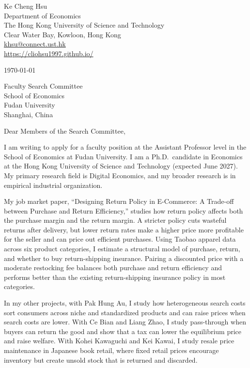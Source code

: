 \documentclass[11pt]{article}
\begin{document}
\begin{flushleft}
Ke Cheng Hsu \\
Department of Economics \\
The Hong Kong University of Science and Technology \\
Clear Water Bay, Kowloon, Hong Kong \\
\href{mailto:khsu@connect.ust.hk}{khsu@connect.ust.hk} \\
\href{https://cliohsu1997.github.io/}{https://cliohsu1997.github.io/}
\end{flushleft}

\vspace{0.2em}
\today

\vspace{0.35em}
Faculty Search Committee \\
School of Economics \\
Fudan University \\
Shanghai, China

\vspace{0.35em}
Dear Members of the Search Committee,

I am writing to apply for a faculty position at the Assistant Professor level in the School of Economics at Fudan University. I am a Ph.D.\ candidate in Economics at the Hong Kong University of Science and Technology (expected June 2027). My primary research field is Digital Economics, and my broader research is in empirical industrial organization.

My job market paper, ``Designing Return Policy in E-Commerce: A Trade-off between Purchase and Return Efficiency,'' studies how return policy affects both the purchase margin and the return margin. A stricter policy cuts wasteful returns after delivery, but lower return rates make a higher price more profitable for the seller and can price out efficient purchases. Using Taobao apparel data across six product categories, I estimate a structural model of purchase, return, and whether to buy return-shipping insurance. Pairing a discounted price with a moderate restocking fee balances both purchase and return efficiency and performs better than the existing return-shipping insurance policy in most categories.

In my other projects, with Pak Hung Au, I study how heterogeneous search costs sort consumers across niche and standardized products and can raise prices when search costs are lower. With Ce Bian and Liang Zhao, I study pass-through when buyers can return the good and show that a tax can lower the equilibrium price and raise welfare. With Kohei Kawaguchi and Kei Kawai, I study resale price maintenance in Japanese book retail, where fixed retail prices encourage inventory but create unsold stock that is returned and discarded.
\end{document}
